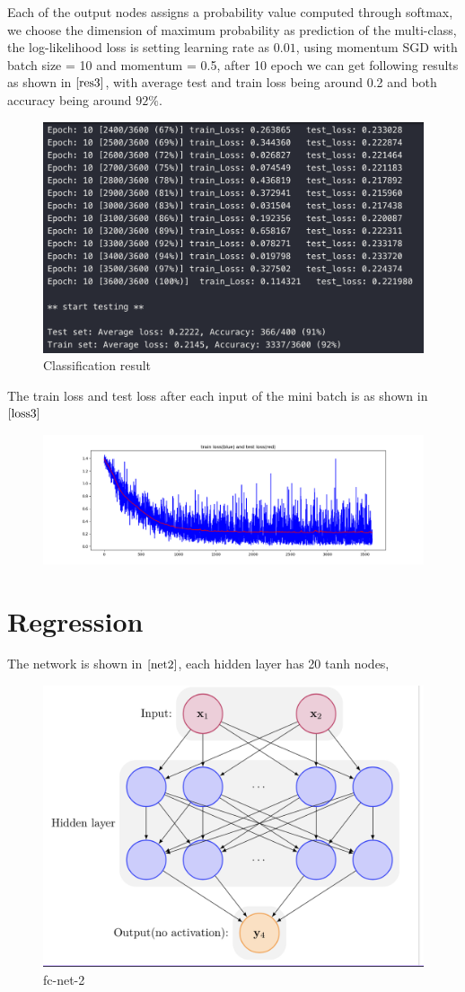 \documentclass[a4paper,12pt]{article}
\begin{document}
Each of the output nodes assigns a probability value computed through softmax,
we choose the dimension of maximum probability as prediction of the multi-class, the log-likelihood loss is
setting learning rate as $0.01$, using momentum SGD with batch size = 10 and momentum = 0.5, 
after 10 epoch we can get following results as shown in $\ref{res3}$, with average test and train loss being around 0.2 and both accuracy being around $92\%$.
\begin{figure}[htbp]
    \centering
    \includegraphics[width = .5\textwidth]{result3}
    \caption{Classification result}
    \label{res3}
\end{figure}

The train loss and test loss after each input of the mini batch is as shown in $\ref{loss3}$
\begin{figure}[htbp]
    \centering
    \includegraphics[width = \textwidth]{loss3}
    \caption{ }
    \label{loss3}
\end{figure}

\section{Regression}

The network is shown in $\ref{net2}$, each hidden layer has 20 tanh nodes,
\begin{figure}[htbp]
    \centering
    \includegraphics[width = .65\textwidth]{net2}
    \caption{fc-net-2}
    \label{net2}
\end{figure} 
\end{document}
